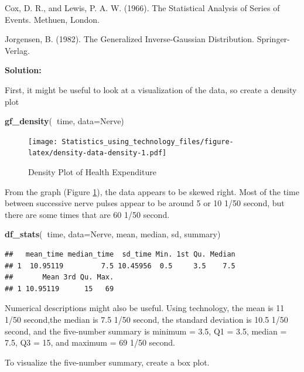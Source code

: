 \documentclass[
]{book}
\newenvironment{Shaded}{\begin{snugshade}}{\end{snugshade}}
\newcommand{\DataTypeTok}[1]{\textcolor[rgb]{0.13,0.29,0.53}{#1}}
\newcommand{\KeywordTok}[1]{\textcolor[rgb]{0.13,0.29,0.53}{\textbf{#1}}}
\newcommand{\NormalTok}[1]{#1}
\newcommand{\OperatorTok}[1]{\textcolor[rgb]{0.81,0.36,0.00}{\textbf{#1}}}
\begin{document}
Cox, D. R., and Lewis, P. A. W. (1966). The Statistical Analysis of Series of Events. Methuen, London.

Jorgensen, B. (1982). The Generalized Inverse-Gaussian Distribution. Springer-Verlag.

\textbf{Solution:}

First, it might be useful to look at a visualization of the data, so create a density plot



\begin{Shaded}
\begin{Highlighting}[]
\KeywordTok{gf_density}\NormalTok{(}\OperatorTok{~}\NormalTok{time, }\DataTypeTok{data=}\NormalTok{Nerve)}
\end{Highlighting}
\end{Shaded}

\begin{figure}
\centering
\texttt{[image: Statistics\_using\_technology\_files/figure-latex/density-data-density-1.pdf]}
\caption{\label{fig:density-data-density}Density Plot of Health Expenditure}
\end{figure}

From the graph (Figure \ref{fig:density-data-density}), the data appears to be skewed right. Most of the time between successive nerve pulses appear to be around 5 or 10 1/50 second, but there are some times that are 60 1/50 second.

\begin{Shaded}
\begin{Highlighting}[]
\KeywordTok{df_stats}\NormalTok{(}\OperatorTok{~}\NormalTok{time, }\DataTypeTok{data=}\NormalTok{Nerve, mean, median, sd, summary)}
\end{Highlighting}
\end{Shaded}

\begin{verbatim}
##   mean_time median_time  sd_time Min. 1st Qu. Median
## 1  10.95119         7.5 10.45956  0.5     3.5    7.5
##       Mean 3rd Qu. Max.
## 1 10.95119      15   69
\end{verbatim}

Numerical descriptions might also be useful. Using technology, the mean is 11 1/50 second,the median is 7.5 1/50 second, the standard deviation is 10.5 1/50 second, and the five-number summary is minimum = 3.5, Q1 = 3.5, median = 7.5, Q3 = 15, and maximum = 69 1/50 second.

To visualize the five-number summary, create a box plot.
\end{document}

